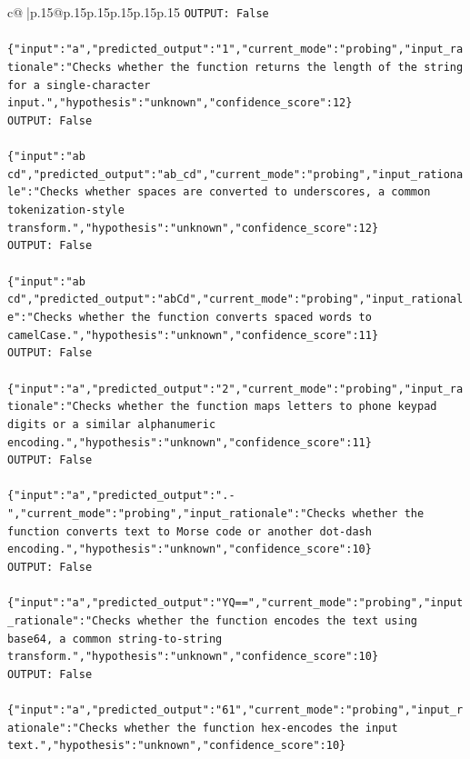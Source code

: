 \documentclass{article}
\begin{document}
{\begin{supertabular}{c@{$\;$}|p{.15\linewidth}@{}p{.15\linewidth}p{.15\linewidth}p{.15\linewidth}p{.15\linewidth}p{.15\linewidth}}
{{{\texttt{OUTPUT: False} \\
\\ 
\texttt{\{"input":"a","predicted\_output":"1","current\_mode":"probing","input\_rationale":"Checks whether the function returns the length of the string for a single{-}character input.","hypothesis":"unknown","confidence\_score":12\}} \\
\texttt{OUTPUT: False} \\
\\ 
\texttt{\{"input":"ab cd","predicted\_output":"ab\_cd","current\_mode":"probing","input\_rationale":"Checks whether spaces are converted to underscores, a common tokenization{-}style transform.","hypothesis":"unknown","confidence\_score":12\}} \\
\texttt{OUTPUT: False} \\
\\ 
\texttt{\{"input":"ab cd","predicted\_output":"abCd","current\_mode":"probing","input\_rationale":"Checks whether the function converts spaced words to camelCase.","hypothesis":"unknown","confidence\_score":11\}} \\
\texttt{OUTPUT: False} \\
\\ 
\texttt{\{"input":"a","predicted\_output":"2","current\_mode":"probing","input\_rationale":"Checks whether the function maps letters to phone keypad digits or a similar alphanumeric encoding.","hypothesis":"unknown","confidence\_score":11\}} \\
\texttt{OUTPUT: False} \\
\\ 
\texttt{\{"input":"a","predicted\_output":".{-}","current\_mode":"probing","input\_rationale":"Checks whether the function converts text to Morse code or another dot{-}dash encoding.","hypothesis":"unknown","confidence\_score":10\}} \\
\texttt{OUTPUT: False} \\
\\ 
\texttt{\{"input":"a","predicted\_output":"YQ==","current\_mode":"probing","input\_rationale":"Checks whether the function encodes the text using base64, a common string{-}to{-}string transform.","hypothesis":"unknown","confidence\_score":10\}} \\
\texttt{OUTPUT: False} \\
\\ 
\texttt{\{"input":"a","predicted\_output":"61","current\_mode":"probing","input\_rationale":"Checks whether the function hex{-}encodes the input text.","hypothesis":"unknown","confidence\_score":10\}} \\
}}}
\end{supertabular}}
\end{document}
